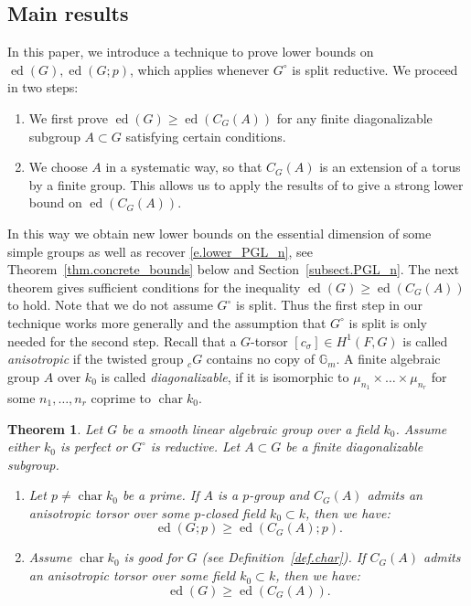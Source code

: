 \documentclass[12pt]{amsart}
\numberwithin{equation}{section}
\newtheorem{theorem}{Theorem}[section]
\theoremstyle{definition}
\newcommand{\ed}{\operatorname{ed}}
\newcommand{\Char}{\operatorname{char}}
\begin{document}
\subsection{Main results}
In this paper, we introduce a technique to prove lower bounds on $\ed(G),\ed(G;p)$, which applies whenever $G^{\circ}$ is split reductive.  We proceed in two steps:
\begin{enumerate}
    \item We first prove $\ed(G)\geq \ed(C_G(A))$ for any finite diagonalizable subgroup $A\subset G$ satisfying certain conditions.
    \item We choose $A$ in a systematic way, so that $C_G(A)$ is an extension of a torus by a finite group. This allows us to apply the results of \cite{lotscher2013essential2} to give a strong lower bound on $\ed(C_G(A))$.
\end{enumerate}
In this way we obtain new lower bounds on the essential dimension of some simple groups as well as recover \eqref{e.lower_PGL_n}, see Theorem~\ref{thm.concrete_bounds} below and Section~\ref{subsect.PGL_n}. The next theorem gives sufficient conditions for the inequality $\ed(G)\geq \ed(C_G(A))$ to hold. Note that we do not assume $G^{\circ}$ is split. Thus the first step in our technique works more generally and the assumption that $G^{\circ}$ is split is only needed for the second step. Recall that a $G$-torsor $[c_\sigma]\in H^1(F,G)$ is called \emph{anisotropic} if the twisted group ${}_c G$ contains no copy of $\mathbb{G}_{m}$.  A finite algebraic group $A$ over $k_0$ is called \emph{diagonalizable}, if it is isomorphic to $\mu_{n_1}\times \dots \times \mu_{n_r}$ for some $n_1,\dots,n_r$ coprime to $\Char k_0$.

\begin{theorem}\label{thm.main}
    Let $G$ be a smooth linear algebraic group over a field $k_0$. Assume either $k_0$ is perfect or $G^{\circ}$ is reductive. Let $A \subset G$ be a finite diagonalizable subgroup.
    \begin{enumerate}
        \item Let $ p\neq \Char k_0$ be a prime. If $A$ is a $p$-group and $C_G(A)$ admits an anisotropic torsor over some $p$-closed field $k_0\subset k$, then we have:
        $$\ed(G;p) \geq \ed(C_G(A);p).$$
        
        \item Assume $\Char k_0$ is good for $G$ (see Definition~\ref{def.char}). If $C_G(A)$ admits an anisotropic torsor  over some field $k_0\subset k$, then we have:
        $$\ed(G) \geq \ed(C_G(A)).$$

        
    \end{enumerate}
\end{theorem}
\end{document}
